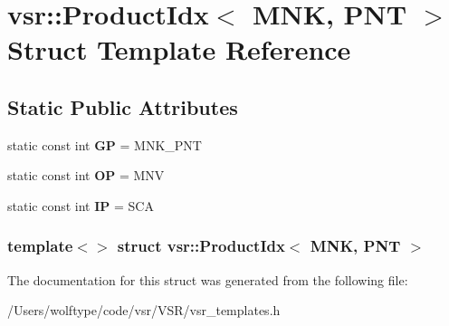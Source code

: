 \hypertarget{structvsr_1_1_product_idx_3_01_m_n_k_00_01_p_n_t_01_4}{\section{vsr\-:\-:Product\-Idx$<$ M\-N\-K, P\-N\-T $>$ Struct Template Reference}
\label{structvsr_1_1_product_idx_3_01_m_n_k_00_01_p_n_t_01_4}
}
\subsection*{Static Public Attributes}
\begin{DoxyCompactItemize}
\item 
\hypertarget{structvsr_1_1_product_idx_3_01_m_n_k_00_01_p_n_t_01_4_a850e4098e283f637a0daf895707f232f}{static const int {\bfseries G\-P} = M\-N\-K\-\_\-\-P\-N\-T}\label{structvsr_1_1_product_idx_3_01_m_n_k_00_01_p_n_t_01_4_a850e4098e283f637a0daf895707f232f}

\item 
\hypertarget{structvsr_1_1_product_idx_3_01_m_n_k_00_01_p_n_t_01_4_a25b6d4b16cd836f0ed92d0b353905fc1}{static const int {\bfseries O\-P} = M\-N\-V}\label{structvsr_1_1_product_idx_3_01_m_n_k_00_01_p_n_t_01_4_a25b6d4b16cd836f0ed92d0b353905fc1}

\item 
\hypertarget{structvsr_1_1_product_idx_3_01_m_n_k_00_01_p_n_t_01_4_a98556d234f7e94205753b70a6ac8b718}{static const int {\bfseries I\-P} = S\-C\-A}\label{structvsr_1_1_product_idx_3_01_m_n_k_00_01_p_n_t_01_4_a98556d234f7e94205753b70a6ac8b718}

\end{DoxyCompactItemize}
\subsubsection*{template$<$$>$ struct vsr\-::\-Product\-Idx$<$ M\-N\-K, P\-N\-T $>$}



The documentation for this struct was generated from the following file\-:\begin{DoxyCompactItemize}
\item 
/\-Users/wolftype/code/vsr/\-V\-S\-R/vsr\-\_\-templates.\-h\end{DoxyCompactItemize}

